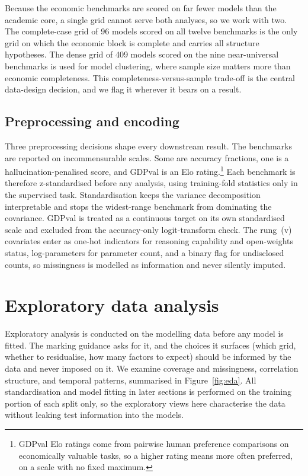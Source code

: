Because the economic benchmarks are scored on far fewer models than the academic core, a single grid
cannot serve both analyses, so we work with two. The complete-case grid of 96 models scored on all
twelve benchmarks is the only grid on which the economic block is complete and carries all structure
hypotheses. The dense grid of 409 models scored on the nine near-universal benchmarks is used for model
clustering, where sample size matters more than economic completeness. This completeness-versus-sample
trade-off is the central data-design decision, and we flag it wherever it bears on a result.

\subsection{Preprocessing and encoding}\label{sec:preproc}
Three preprocessing decisions shape every downstream result. The benchmarks are reported on
incommensurable scales. Some are accuracy fractions, one is a hallucination-penalised score, and GDPval
is an Elo rating.\footnote{GDPval Elo ratings come from pairwise human preference comparisons on economically valuable tasks, so a higher rating means more often preferred, on a scale with no fixed maximum.} Each benchmark is therefore z-standardised before any analysis, using training-fold statistics only
in the supervised task. Standardisation keeps the variance
decomposition interpretable and stops the widest-range benchmark from dominating the covariance. GDPval
is treated as a continuous target on its own standardised
scale and excluded from the accuracy-only logit-transform check. The rung~(v) covariates
enter as one-hot indicators for reasoning capability and open-weights status,
log-parameters for parameter count, and a binary flag for undisclosed counts, so
missingness is modelled as information and never silently imputed.

\section{Exploratory data analysis}\label{sec:eda}
Exploratory analysis is conducted on the modelling data before any model is fitted. The marking guidance asks for it, and the choices it surfaces (which grid, whether to residualise,
how many factors to expect) should be informed by the data and never imposed on it. We examine
coverage and missingness, correlation structure, and temporal patterns, summarised in
Figure~\ref{fig:eda}. All standardisation and model fitting in later sections is performed on the
training portion of each split only, so the exploratory views here characterise the data without leaking
test information into the models.

